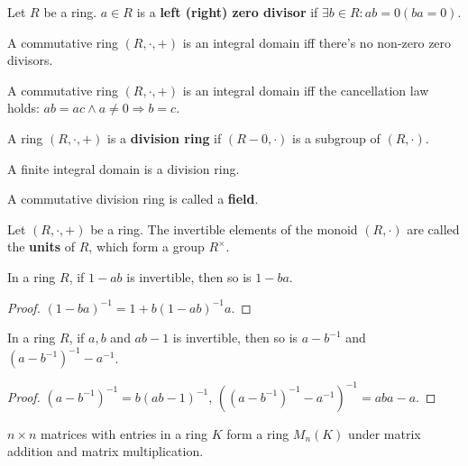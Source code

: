 \documentclass[12pt]{book}
\begin{document}
\begin{definition}
	Let $R$ be a ring. $a\in R$ is a {\bf left (right) zero divisor} if $\exists b\in R: ab=0(ba=0)$.
\end{definition}

\begin{lemma}
	A commutative ring $(R,\cdot,+)$ is an integral domain iff there's no non-zero zero divisors.
\end{lemma}
\begin{lemma}
	A commutative ring $(R,\cdot,+)$ is an integral domain iff the cancellation law holds: $ab=ac\wedge a\neq 0\Rightarrow b=c$.
\end{lemma}

\begin{definition}
	A ring $(R,\cdot,+)$ is a {\bf division ring} if $(R-0,\cdot)$ is a subgroup of $(R,\cdot)$.
\end{definition}

\begin{lemma}
	A finite integral domain is a division ring.
\end{lemma}

\begin{definition}
	A commutative division ring is called a {\bf field}.
\end{definition}

\begin{definition}
	Let $(R,\cdot,+)$ be a ring. The invertible elements of the monoid $(R,\cdot)$ are called the {\bf units} of $R$, which form a group $R^\times$.
\end{definition}

\begin{lemma}
	In a ring $R$, if $1-ab$ is invertible, then so is $1-ba$.
\end{lemma}
\begin{proof}
	$(1-ba)^{-1}=1+b(1-ab)^{-1}a$.
\end{proof}

\begin{lemma}[Hua]
	In a ring $R$, if $a,b$ and $ab-1$ is invertible, then so is $a-b^{-1}$ and $(a-b^{-1})^{-1}-a^{-1}$.
\end{lemma}
\begin{proof}
	$(a-b^{-1})^{-1}=b(ab-1)^{-1}$, $((a-b^{-1})^{-1}-a^{-1})^{-1}=aba-a$.
\end{proof}

\begin{example}
	$n\times n$ matrices with entries in a ring $K$ form a ring $M_n(K)$ under matrix addition and matrix multiplication.
\end{example}
\end{document}
